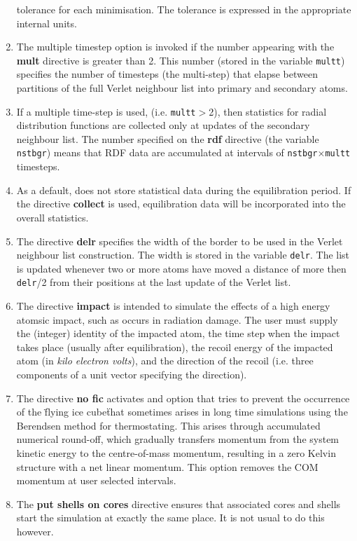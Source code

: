 \begin{enumerate}
      tolerance for each minimisation. The tolerance is expressed in
      the appropriate internal units.
\item The \D{} multiple timestep option is invoked if the number
      appearing with the {\bf mult} directive is greater than 2. This
      number (stored in the variable {\tt multt}) specifies the number
      of timesteps (the multi-step) that elapse between partitions of 
      the full Verlet neighbour list into primary and secondary atoms.
\item If a multiple time-step is used, (i.e. {\tt multt}$>$2), then
      statistics  for radial distribution functions are collected
      only at updates of the secondary neighbour list. The 
      number specified on the {\bf rdf} directive (the variable 
      {\tt nstbgr}) means that RDF data are accumulated at intervals
      of {\tt nstbgr}$\times${\tt multt} timesteps.
\item As a default, \D{} does not store statistical data during
      the equilibration period. If the directive {\bf collect} is
      used, equilibration data will be incorporated into the overall
      statistics.
\item The directive {\bf delr} specifies the width of the border to be used in
      the Verlet neighbour list construction. The
      width is stored in the variable {\tt delr}. The list is updated whenever
      two or more atoms have moved a distance of more then {\tt delr}/2 from
      their positions at the last update of the Verlet list.
\item The directive {\bf impact} is intended to simulate the effects of a high
      energy atomsic impact, such as occurs in radiation damage. The user must
      supply the (integer) identity of the impacted atom, the time step when
      the impact takes place (usually after equilibration), the recoil energy
      of the impacted atom (in {\em kilo electron volts}), and the direction
      of the recoil (i.e. three components of a unit vector specifying the
      direction).
\item The directive {\bf no fic} activates and option that tries to prevent
  the occurrence of the \"flying ice cube\" that sometimes arises in long time
  simulations using the Berendsen method for thermostating. This arises
  through accumulated numerical round-off, which gradually transfers momentum
  from the system kinetic energy to the centre-of-mass momentum, resulting in
  a zero Kelvin structure with a net linear momentum. This option removes the
  COM momentum at user selected intervals.
\item The {\bf put shells on cores} directive ensures that associated cores
  and shells start the simulation at exactly the same place. It is not usual
  to do this however.
\end{enumerate}

